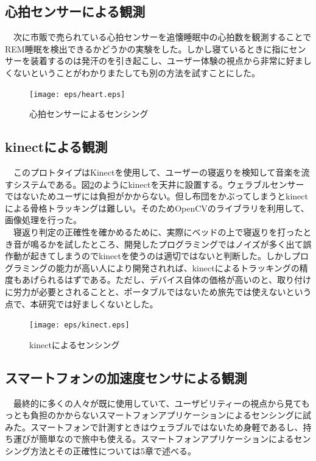 \subsection{心拍センサーによる観測}
　次に市販で売られている心拍センサーを追懐睡眠中の心拍数を観測することでREM睡眠を検出できるかどうかの実験をした。しかし寝ているときに指にセンサーを装着するのは発汗のを引き起こし、ユーザー体験の視点から非常に好ましくないということがわかりまたしても別の方法を試すことにした。

\begin{figure}[htbp]
\begin{center}
\texttt{[image: eps/heart.eps]}
\caption{心拍センサーによるセンシング}
\label{heart}
\end{center}
\end{figure}

\subsection{kinectによる観測}
　このプロトタイプはKinectを使用して、ユーザーの寝返りを検知して音楽を流すシステムである。図\ref{kinect}のようにkinectを天井に設置する。ウェラブルセンサーではないためユーザには負担がかからない。但し布団をかぶってしまうとkinectによる骨格トラッキングは難しい。そのためOpenCVのライブラリを利用して、画像処理を行った。\\
　寝返り判定の正確性を確かめるために、実際にベッドの上で寝返りを打ったとき音が鳴るかを試したところ、開発したプログラミングではノイズが多く出て誤作動が起きてしまうのでkinectを使うのは適切ではないと判断した。しかしプログラミングの能力が高い人により開発されれば、kinectによるトラッキングの精度もあげられるはずである。ただし、デバイス自体の価格が高いのと、取り付けに労力が必要とされることと、ポータブルではないため旅先では使えないという点で、本研究では好ましくないとした。

\begin{figure}[htbp]
\begin{center}
\texttt{[image: eps/kinect.eps]}
\caption{kinectによるセンシング}
\label{kinect}
\end{center}
\end{figure}

\subsection{スマートフォンの加速度センサによる観測}
　最終的に多くの人々が既に使用していて、ユーザビリティーの視点から見てもっとも負担のかからないスマートフォンアプリケーションによるセンシングに試みた。スマートフォンで計測すときはウェラブルではないため身軽であるし、持ち運びが簡単なので旅中も使える。スマートフォンアプリケーションによるセンシング方法とその正確性については5章で述べる。

